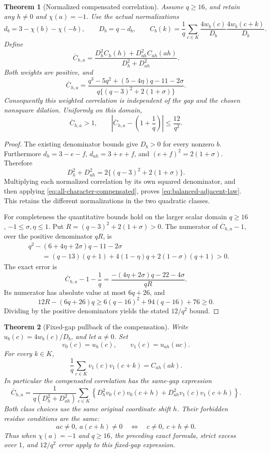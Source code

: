 \documentclass[11pt]{article}
\newtheorem{theorem}{Theorem}[section]
\begin{document}
\begin{theorem}[Normalized compensated correlation]
Assume \(q\ge16\), and retain any \(h\ne0\) and \(\chi(a)=-1\).
Use the actual normalizations
\[
 d_b=3-\chi(b)-\chi(-b),\qquad D_b=q-d_b,\qquad
 C_b(k)=\frac1q\sum_{c\in K}
       \frac{4w_b(c)}{D_b}\frac{4w_b(c+k)}{D_b}.
\]
Define
\[
 \overline C_{h,a}
 =\frac{D_h^2C_h(h)+D_{ah}^2C_{ah}(ah)}
        {D_h^2+D_{ah}^2}.
\]
Both weights are positive, and
\begin{equation}
 \overline C_{h,a}
 =\frac{q^3-5q^2+(5-4\eta)q-11-2\sigma}
        {q\{(q-3)^2+2(1+\sigma)\}}.
 \label{eq:balanced-adjacent-law}
\end{equation}
Consequently this weighted correlation is independent of the gap
and the chosen nonsquare dilation. Uniformly on this domain,
\[
 \overline C_{h,a}>1,\qquad
 \left|\overline C_{h,a}-\left(1+\frac1q\right)\right|
     \le\frac{12}{q^2}.
\]
\end{theorem}

\begin{proof}
The existing denominator bounds give \(D_b>0\) for every nonzero \(b\).
Furthermore \(d_h=3-e-f\), \(d_{ah}=3+e+f\), and
\((e+f)^2=2(1+\sigma)\). Therefore
\[
 D_h^2+D_{ah}^2=2\{(q-3)^2+2(1+\sigma)\}.
\]
Multiplying each normalized correlation by its own squared denominator,
and then applying \eqref{eq:all-character-compensated}, proves
\eqref{eq:balanced-adjacent-law}. This retains the different
normalizations in the two quadratic classes.

For completeness the quantitative bounds hold on the larger scalar
domain \(q\ge16\), \(-1\le\sigma,\eta\le1\).
Put \(R=(q-3)^2+2(1+\sigma)>0\).
The numerator of \(\overline C_{h,a}-1\), over the positive
denominator \(qR\), is
\begin{align*}
 &q^2-(6+4\eta+2\sigma)q-11-2\sigma\\
 &\qquad=(q-13)(q+1)+4(1-\eta)q+2(1-\sigma)(q+1)>0.
\end{align*}
The exact error is
\[
 \overline C_{h,a}-1-\frac1q
 =\frac{-(4\eta+2\sigma)q-22-4\sigma}{qR}.
\]
Its numerator has absolute value at most \(6q+26\), and
\[
 12R-(6q+26)q
 \ge6(q-16)^2+94(q-16)+76\ge0.
\]
Dividing by the positive denominators yields the stated \(12/q^2\) bound.
\end{proof}

\begin{theorem}[Fixed-gap pullback of the compensation]
Write \(u_b(c)=4w_b(c)/D_b\), and let \(a\ne0\). Set
\[
 v_0(c)=u_h(c),\qquad v_1(c)=u_{ah}(ac).
\]
For every \(k\in K\),
\[
 \frac1q\sum_{c\in K}v_1(c)v_1(c+k)=C_{ah}(ak).
\]
In particular the compensated correlation has the same-gap expression
\[
 \overline C_{h,a}
 =\frac{1}{q(D_h^2+D_{ah}^2)}
   \sum_{c\in K}\left\{
       D_h^2v_0(c)v_0(c+h)+D_{ah}^2v_1(c)v_1(c+h)
   \right\}.
\]
Both class choices use the same original coordinate shift \(h\).
Their forbidden residue conditions are the same:
\[
 ac\ne0,\ a(c+h)\ne0
 \quad\Longleftrightarrow\quad c\ne0,\ c+h\ne0.
\]
Thus when \(\chi(a)=-1\) and \(q\ge16\), the preceding exact formula,
strict excess over \(1\), and \(12/q^2\) error apply to this fixed-gap
expression.
\label{thm:fixed-gap-pullback}
\end{theorem}
\end{document}
